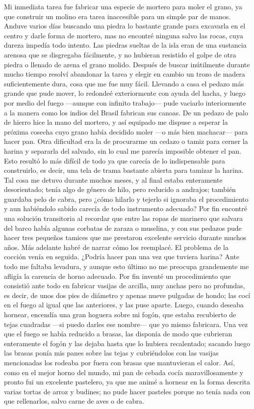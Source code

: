 \documentclass{novela}
\begin{document}
    Mi inmediata tarea fue fabricar una especie de mortero para moler el grano, ya que construir un molino era tarea inaccesible para un simple par de manos. Anduve varios días buscando una piedra lo bastante grande para excavarla en el centro y darle forma de mortero, mas no encontré ninguna salvo las rocas, cuya dureza impedía todo intento. Las piedras sueltas de la isla eran de una sustancia arenosa que se disgregaba fácilmente, y no hubieran resistido el golpe de otra piedra o llenado de arena el grano molido. Después de buscar inútilmente durante mucho tiempo resolví abandonar la tarea y elegir en cambio un trozo de madera suficientemente dura, cosa que me fue muy fácil. Llevando a casa el pedazo más grande que pude mover, lo redondeé exteriormente con ayuda del hacha, y luego por medio del fuego —aunque con infinito trabajo— pude vaciarlo interiormente a la manera como los indios del Brasil fabrican sus canoas. De un pedazo de palo de hierro hice la mano del mortero, y así equipado me dispuse a esperar la próxima cosecha cuyo grano había decidido moler —o más bien machacar— para hacer pan.
    Otra dificultad era la de procurarme un cedazo o tamiz para cerner la harina y separarla del salvado, sin lo cual me parecía imposible obtener el pan. Esto resultó lo más difícil de todo ya que carecía de lo indispensable para construirlo, es decir, una tela de trama bastante abierta para tamizar la harina. Tal cosa me detuvo durante muchos meses, y al final estaba enteramente desorientado; tenía algo de género de hilo, pero reducido a andrajos; también guardaba pelo de cabra, pero ¿cómo hilarlo y tejerlo si ignoraba el procedimiento y aun habiéndolo sabido carecía de todo instrumento adecuado? Por fin encontré una solución transitoria al recordar que entre las ropas de marinero que salvara del barco había algunas corbatas de zaraza o muselina, y con sus pedazos pude hacer tres pequeños tamices que me prestaron excelente servicio durante muchos años. Más adelante habré de narrar cómo los reemplacé.
    El problema de la cocción venía en seguida. ¿Podría hacer pan una vez que tuviera harina? Ante todo me faltaba levadura, y aunque esto último no me preocupa grandemente me afligía la carencia de horno adecuado. Por fin inventé un procedimiento que consistió ante todo en fabricar vasijas de arcilla, muy anchas pero no profundas, es decir, de unos dos pies de diámetro y apenas nueve pulgadas de hondo; las cocí en el fuego al igual que las anteriores, y las puse aparte. Luego, cuando deseaba hornear, encendía una gran hoguera sobre mi fogón, que estaba recubierto de tejas cuadradas —si puedo darles ese nombre— que yo mismo fabricara. Una vez que el fuego se había reducido a brasas, las disponía de modo que cubrieran enteramente el fogón y las dejaba hasta que lo hubiera recalentado; sacando luego las brasas ponía mis panes sobre las tejas y cubriéndolos con las vasijas mencionadas los rodeaba por fuera con brasas que mantuvieran el calor. Así, como en el mejor horno del mundo, mi pan de cebada cocía maravillosamente y pronto fui un excelente pastelero, ya que me animé a hornear en la forma descrita varias tortas de arroz y budines; no pude hacer pasteles porque no tenía nada con que rellenarlos, salvo carne de aves o de cabra.
\end{document}
